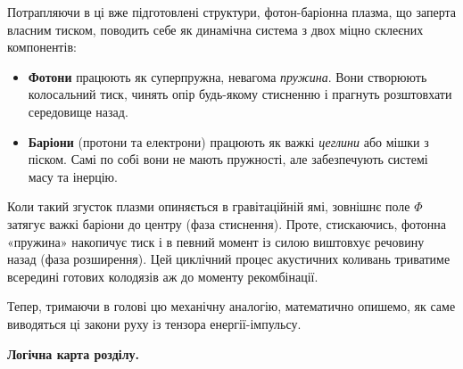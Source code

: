 Потрапляючи в ці вже підготовлені структури, фотон-баріонна плазма,
що заперта власним тиском, поводить себе як динамічна система з двох
міцно склеєних компонентів:
\begin{itemize}
    \item \textbf{Фотони} працюють як суперпружна, невагома \emph{пружина}.
    Вони створюють колосальний тиск, чинять опір будь-якому стисненню
    і прагнуть розштовхати середовище назад.
    \item \textbf{Баріони} (протони та електрони) працюють як важкі
    \emph{цеглини} або мішки з піском. Самі по собі вони не мають
    пружності, але забезпечують системі масу та інерцію.
\end{itemize}
Коли такий згусток плазми опиняється в гравітаційній ямі, зовнішнє
поле $\Phi$ затягує важкі баріони до центру (фаза стиснення).
Проте, стискаючись, фотонна «пружина» накопичує тиск і в певний
момент із силою виштовхує речовину назад (фаза розширення).
Цей циклічний процес акустичних коливань триватиме всередині
готових колодязів аж до моменту рекомбінації.


Тепер, тримаючи в голові цю механічну аналогію, математично опишемо,
як саме виводяться ці закони руху із тензора енергії-імпульсу.


\bigskip
\noindent\textbf{Логічна карта розділу.}

